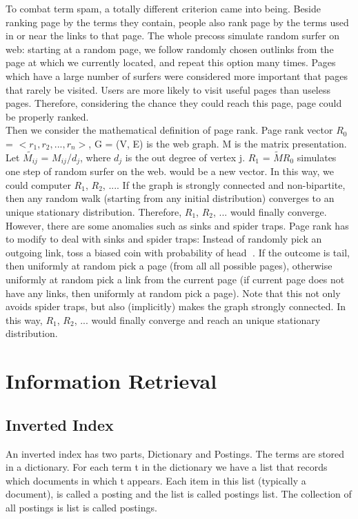 \documentclass{article}
\begin{document}
To combat term spam, a totally different criterion came into being. Beside ranking page by the terms they contain, people also rank page by the terms used in or near the links to that page. The whole precoss simulate random surfer on web: starting at a random page, we follow randomly chosen outlinks from the page at which we currently located, and repeat this option many times. Pages which have a large number of surfers were considered more important that pages that rarely be visited. Users are more likely to visit useful pages than useless pages. Therefore, considering the chance they could reach this page, page could be properly ranked.\\

Then we consider the mathematical definition of page rank. Page rank vector $R_0$ = $<r_1, r_2, ..., r_n>$, G = (V, E) is the web graph. M is the matrix presentation. Let \textbf{$\tilde{M_{ij}}$} = \textbf{$M_{ij}$}/$d_{j}$, where $d_{j}$ is the out degree of vertex j. $R_1$ = \textbf{$\tilde{M}$}$R_0$ simulates one step of random surfer on the web. would be a new vector. In this way, we could computer $R_1$, $R_2$, .... If the graph is strongly connected and non-bipartite, then any random walk (starting from any initial distribution) converges to an unique stationary distribution. Therefore, $R_1$, $R_2$, ... would finally converge.\\

However, there are some anomalies such as sinks and spider traps. Page rank has to modify to deal with sinks and spider traps: Instead of randomly pick an outgoing link, toss a biased coin with probability of head . If the outcome is tail, then uniformly at random pick a page (from all all possible pages), otherwise uniformly at random pick a link from the current page (if current page does not have any links, then uniformly
at random pick a page). Note that this not only avoids spider traps, but also (implicitly) makes the graph strongly connected. In this way, $R_1$, $R_2$, ... would finally converge and reach an unique stationary distribution. \\



\section{Information Retrieval}
\subsection{Inverted Index}
An inverted index has two parts, Dictionary and Postings. The terms are stored in a dictionary.
For each term t in the dictionary we have a list that records which documents in which t appears.
Each item in this list (typically a document), is called a posting and the list is called postings list.
The collection of all postings is list is called postings.\\
\end{document}
